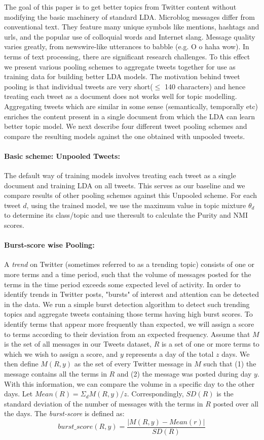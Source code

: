 \documentclass[10pt,a5paper,twoside]{article}
\begin{document}
The goal of this paper is to get better topics from Twitter content without modifying the basic machinery of standard LDA. Microblog messages differ from conventional text. They feature many unique symbols like mentions, hashtags and urls, and the popular use of colloquial words and Internet slang. Message quality varies greatly, from newswire-like utterances  to babble (e.g. O o haha wow). In terms of text processing, there are significant research challenges. To this effect we present various pooling schemes to aggregate tweets together for use as training data for building better LDA models. The motivation behind tweet pooling is that individual tweets are very short($\leq$ 140 characters) and hence treating each tweet as a document does not works well for topic modelling. Aggregating tweets which are similar in some sense (semantically, temporally etc) enriches the content present in a single document from which the LDA can learn better topic model. We next describe four different tweet pooling schemes and compare the resulting models against the one obtained with unpooled tweets. 

\paragraph{Basic scheme: Unpooled Tweets:}
The default way of training models involves treating each tweet as a single document and training LDA on all tweets. This serves as our baseline and we compare results of other pooling schemes against this Unpooled scheme. For each tweet $d$, using the trained model, we use the maximum value in topic mixture $\theta_{d} $ to determine its class/topic and use theresult to calculate the Purity and NMI scores.

\paragraph{Burst-score wise Pooling:}
A \textit{trend} on Twitter (sometimes referred to as a trending topic) consists of one or more terms and a time period, such that the volume of messages posted for the terms in the time period exceeds some expected level of activity. In order to identify trends in Twitter posts, "bursts" of interest and attention can be detected in the data. We run a simple burst detection algorithm to detect such trending topics and aggregate tweets containing those terms having high burst scores.
To identify terms that appear more frequently than expected, we will assign a score to terms according to their deviation from an expected frequency. Assume that $M$ is the set of all messages in our Tweets dataset, $R$ is a set of one or more terms to which we wish to assign a score, and $y$ represents a day of the total $z$ days. We then define $M(R, y)$ as the set of every Twitter message in $M$ such that (1) the message contains all the terms in $R$ and (2) the message was posted during day $y$. With this information, we can compare the volume in a specific day to the other days. Let 
$ Mean(R) = \Sigma_d M(R,y) / z $.
Correspondingly, $ SD(R) $ is the standard deviation of the number of messages with the terms in $R$ posted over all the days. The \textit{burst-score} is defined as:
\[
burst\_score(R,y) = \frac{|M(R,y) - Mean(r)|}{SD(R)} 
\]
\end{document}
